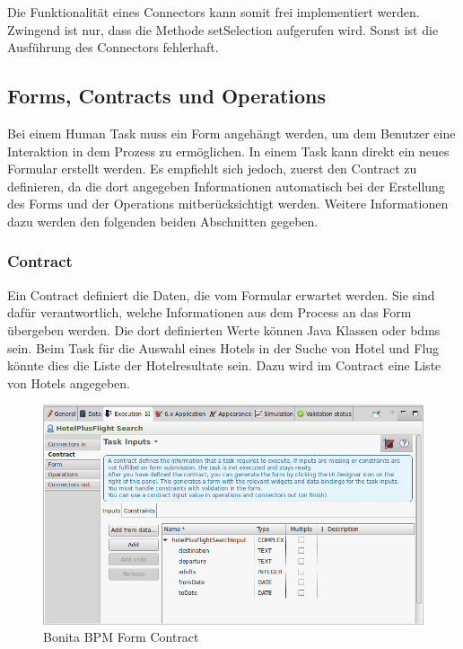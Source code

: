 Die Funktionalität eines Connectors kann somit frei implementiert werden. Zwingend ist nur, dass die Methode setSelection aufgerufen wird. Sonst ist die Ausführung des Connectors fehlerhaft.

\subsection{Forms, Contracts und Operations}
\label{sec:analyse:bonita:forms}
Bei einem Human Task muss ein Form angehängt werden, um dem Benutzer eine Interaktion in dem Prozess zu ermöglichen.
In einem Task kann direkt ein neues Formular erstellt werden. Es empfiehlt sich jedoch, zuerst den Contract zu definieren, da die dort angegeben Informationen automatisch bei der Erstellung des Forms und der Operations mitberücksichtigt werden. Weitere Informationen dazu werden den folgenden beiden Abschnitten gegeben.

\subsubsection{Contract}
\label{sec:analyse:bonita:forms:contract}
Ein Contract definiert die Daten, die vom Formular erwartet werden. Sie sind dafür verantwortlich, welche Informationen aus dem Process an das Form übergeben werden. Die dort definierten Werte können Java Klassen oder \glspl{bdm} sein. Beim Task für die Auswahl eines Hotels in der Suche von Hotel und Flug könnte dies die Liste der Hotelresultate sein. Dazu wird im Contract eine Liste von Hotels angegeben.
\begin{figure}[H]
	\centering
	\includegraphics[width=1\textwidth]{images/bonita-contract.png}
	\caption{Bonita BPM Form Contract}
	\label{fig:analyse:bonita:forms:contract}
\end{figure}

